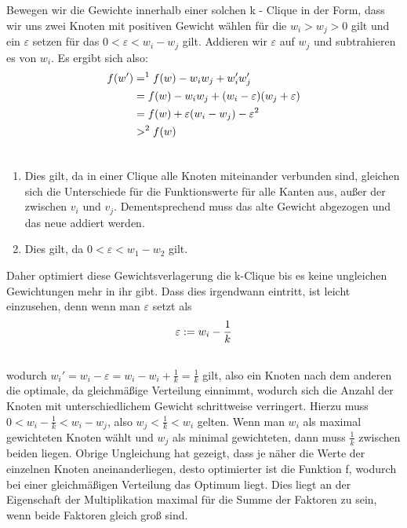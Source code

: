 \documentclass[12pt, a4paper]{article}
\begin{document}
Bewegen wir die Gewichte innerhalb einer solchen k - Clique in der Form, dass wir uns zwei Knoten mit positiven Gewicht wählen für die $w_i > w_j > 0$ gilt und ein $\varepsilon$ setzen für das $0 < \varepsilon < w_i - w_j$ gilt. Addieren wir $\varepsilon$ auf $w_j$ und subtrahieren es von $w_i$. Es ergibt sich also:
\begin{gather}
\begin{split}f(w') &=^1 f(w) - w_i w_j + w'_i w'_j \\
&= f(w) - w_i w_j + (w_i - \varepsilon)(w_j + \varepsilon) \\
&= f(w) + \varepsilon (w_i - w_j) - \varepsilon^2 \\
&>^2 f(w)\end{split}\notag\\\begin{split}\end{split}\notag
\end{gather}\begin{enumerate}
\item {}
Dies gilt, da in einer Clique alle Knoten miteinander verbunden sind, gleichen sich die Unterschiede für die Funktionswerte für alle Kanten aus, außer der zwischen $v_i$ und $v_j$. Dementsprechend muss das alte Gewicht abgezogen und das neue addiert werden.

\item {}
Dies gilt, da $0 < \varepsilon < w_1 - w_2$ gilt.

\end{enumerate}

Daher optimiert diese Gewichtsverlagerung die k-Clique bis es keine ungleichen Gewichtungen mehr in ihr gibt.
Dass dies irgendwann eintritt, ist leicht einzusehen, denn wenn man $\varepsilon$ setzt als
\begin{gather}
\begin{split}\varepsilon := w_i - \frac{1}{k}\end{split}\notag\\\begin{split}\end{split}\notag
\end{gather}
wodurch $w_i' = w_i - \varepsilon = w_i - w_i + \frac{1}{k} = \frac{1}{k}$ gilt, also ein Knoten nach dem anderen die optimale, da gleichmäßige Verteilung einnimmt, wodurch sich die Anzahl der Knoten mit unterschiedlichem Gewicht schrittweise verringert. Hierzu muss $0 < w_i - \frac{1}{k} < w_i - w_j$, also $w_j < \frac{1}{k} < w_i$ gelten. Wenn man $w_i$ als maximal gewichteten Knoten wählt und $w_j$ als minimal gewichteten, dann muss $\frac{1}{k}$ zwischen beiden liegen. Obrige Ungleichung hat gezeigt, dass je näher die Werte der einzelnen Knoten aneinanderliegen, desto optimierter ist die Funktion f, wodurch bei einer gleichmäßigen Verteilung das Optimum liegt. Dies liegt an der Eigenschaft der Multiplikation maximal für die Summe der Faktoren zu sein, wenn beide Faktoren gleich groß sind.
\end{document}
